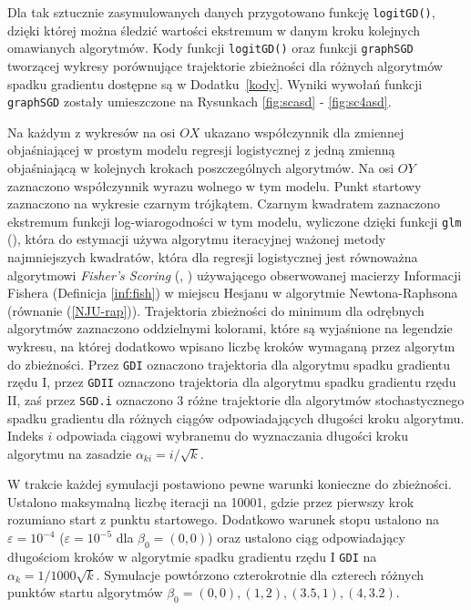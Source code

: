 Dla tak sztucznie zasymulowanych danych przygotowano funkcję \texttt{logitGD()}, dzięki której można śledzić wartości ekstremum w danym kroku kolejnych omawianych algorytmów. Kody funkcji \texttt{logitGD()} oraz funkcji \texttt{graphSGD} tworzącej wykresy porównujące trajektorie zbieżności dla różnych algorytmów spadku gradientu  dostępne są w Dodatku~\ref{kody}. Wyniki wywołań funkcji \texttt{graphSGD} zostały umieszczone na Rysunkach \ref{fig:scasd} - \ref{fig:sc4asd}.

Na każdym z wykresów na osi $OX$ ukazano współczynnik dla zmiennej objaśniającej w prostym modelu regresji logistycznej z jedną zmienną objaśniającą w kolejnych krokach poszczególnych algorytmów. Na osi $OY$ zaznaczono współczynnik wyrazu wolnego w tym modelu. Punkt startowy zaznaczono na wykresie czarnym trójkątem. Czarnym kwadratem zaznaczono ekstremum funkcji log-wiarogodności w tym modelu, wyliczone dzięki funkcji \texttt{glm} (\cite{glmglm}), która do estymacji używa algorytmu iteracyjnej ważonej metody najmniejszych kwadratów, która dla regresji logistycznej jest równoważna algorytmowi \textit{Fisher's Scoring} (\cite{scoring1}, \cite{scoring2}) używającego obserwowanej macierzy Informacji Fishera (Definicja \ref{inf:fish}) w miejscu Hesjanu w algorytmie Newtona-Raphsona (równanie (\ref{NJU-rap})). Trajektoria zbieżności do minimum dla odrębnych algorytmów zaznaczono oddzielnymi kolorami, które są wyjaśnione na legendzie wykresu, na której dodatkowo wpisano liczbę kroków wymaganą przez algorytm do zbieżności. Przez \texttt{GDI} oznaczono trajektoria dla algorytmu spadku gradientu rzędu I, przez \texttt{GDII} oznaczono trajektoria dla algorytmu spadku gradientu rzędu II, zaś przez \texttt{SGD.i} oznaczono 3 różne trajektorie dla algorytmów stochastycznego spadku gradientu dla różnych ciągów odpowiadających długości kroku algorytmu. Indeks $i$ odpowiada ciągowi wybranemu do wyznaczania długości kroku algorytmu na zasadzie $\alpha_{ki} = i/\sqrt{k}$.

W trakcie każdej symulacji postawiono pewne warunki konieczne do zbieżności. Ustalono maksymalną liczbę iteracji na 10001, gdzie przez pierwszy krok rozumiano start z punktu startowego. Dodatkowo warunek stopu ustalono na $\varepsilon=10^{-4}$ ($\varepsilon=10^{-5}$ dla $\beta_0 = (0,0)$) oraz ustalono ciąg odpowiadający długościom kroków w algorytmie spadku gradientu rzędu I \texttt{GDI} na $\alpha_{k} = 1/1000\sqrt{k}$. Symulacje powtórzono czterokrotnie dla czterech różnych punktów startu algorytmów $\beta_0 = (0,0), (1,2), (3.5,1), (4,3.2).$

